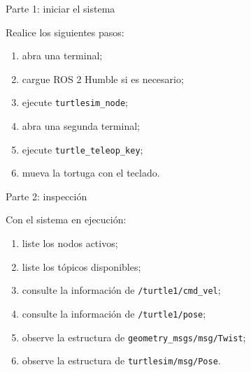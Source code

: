 \documentclass[aspectratio=169]{beamer}
\begin{document}
\begin{frame}{Parte 1: iniciar el sistema}

Realice los siguientes pasos:

\begin{enumerate}
    \item abra una terminal;
    \item cargue ROS 2 Humble si es necesario;
    \item ejecute \texttt{turtlesim\_node};
    \item abra una segunda terminal;
    \item ejecute \texttt{turtle\_teleop\_key};
    \item mueva la tortuga con el teclado.
\end{enumerate}

\vspace{0.3cm}


\end{frame}

\begin{frame}{Parte 2: inspección}

Con el sistema en ejecución:

\begin{enumerate}
    \item liste los nodos activos;
    \item liste los tópicos disponibles;
    \item consulte la información de \texttt{/turtle1/cmd\_vel};
    \item consulte la información de \texttt{/turtle1/pose};
    \item observe la estructura de \texttt{geometry\_msgs/msg/Twist};
    \item observe la estructura de \texttt{turtlesim/msg/Pose}.
\end{enumerate}

\vspace{0.3cm}


\end{frame}
\end{document}
